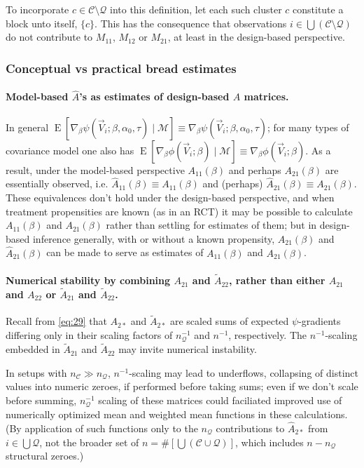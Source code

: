 \documentclass{article}
\newcommand{\EE}{\operatorname{E}}
\begin{document}
To incorporate $c\in \mathcal{C}\setminus\mathcal{Q}$ into this
definition, let each such cluster $c$ constitute a block unto itself,
$\{c\}$. This has the consequence that observations $i
\in \bigcup\left(\mathcal{C}\setminus\mathcal{Q}\right)$ do not
contribute to $M_{11}$, $M_{12}$ or $M_{21}$, at least in the
design-based perspective.

  \subsubsection{Conceptual vs practical bread estimates} \label{sec:conc-vs-pract}
  \paragraph{Model-based $\hat{A}$'s as estimates of design-based $A$ matrices.}%
  In general
  $\EE [\nabla_{\beta}\psi(\vec{V}_{i}; \beta, \alpha_{0},\tau ) \mid
  \mathcal{M}] \equiv \nabla_{\beta}\psi(\vec{V}_{i}; \beta,
  \alpha_{0}, \tau )$; for many types of covariance model one also has
  $\EE [\nabla_{\beta}\phi(\vec{V}_{i}; \beta ) \mid \mathcal{M}]
  \equiv \nabla_{\beta}\phi(\vec{V}_{i}; \beta )$. As a result, under
  the model-based perspective $A_{11}(\beta)$ and perhaps
  $A_{21}(\beta)$ are essentially observed, i.e.
  $\hat{A}_{11}(\beta) \equiv A_{11}(\beta)$ and (perhaps)
  $\hat{A}_{21}(\beta) \equiv A_{21}(\beta)$.  These equivalences
  don't hold under the design-based perspective, and when treatment
  propensities are known (as in an RCT) it may be possible to
  calculate $A_{11}(\beta)$ and $A_{21}(\beta)$ rather than settling
  for estimates of them; but in design-based inference generally, with
  or without a known propensity, $A_{21}(\beta)$ and
  $\hat{A}_{21}(\beta)$ can be made to serve as estimates of
  $A_{11}(\beta)$ and $A_{21}(\beta)$.

\paragraph{Numerical stability by combining ${A}_{21}$ and
  $\tilde{A}_{22}$, rather than either
  ${A}_{21}$ and ${A}_{22}$ or $\tilde{A}_{21}$ and $\tilde{A}_{22}$.}
Recall from \eqref{eq:29} that $A_{2*}$ and $\tilde{A}_{2*}$ are
scaled sums of expected $\psi$-gradients differing only in their
scaling factors of $n_{\mathcal{Q}}^{-1}$ and $n^{-1}$,
respectively. The $n^{-1}$-scaling embedded
in $\tilde{A}_{21}$ and $\tilde{A}_{22}$ may invite numerical
instability.

  In setups with
  $n_{\mathcal{C}} \gg n_{\mathcal{Q}}$, $n^{-1}$-scaling may lead to underflows,
  collapsing of distinct values into numeric zeroes, if performed
  before taking sums; even if we don't scale before summing,
  $n_{\mathcal{Q}}^{-1}$ scaling of these matrices could faciliated improved
  use of numerically optimized mean and weighted mean functions in
  these calculations.  (By application of such functions only to the
  $n_{\mathcal{Q}}$ contributions to $\hat{A}_{2*}$  from $i \in \bigcup \mathcal{Q}$, not the broader set of $n = \#\left[\bigcup (\mathcal{C}\cup
    \mathcal{Q}) \right]$, which includes $n - n_{\mathcal{Q}}$ structural
  zeroes.)
\end{document}
